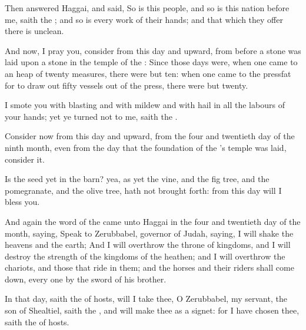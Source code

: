 \verse Then answered Haggai, and said, So is this people, and so is this nation before me, saith the \LORD; and so is every work of their hands; and that which they offer there is unclean.

\verse And now, I pray you, consider from this day and upward, from before a stone was laid upon a stone in the temple of the \LORD: \verse Since those days were, when one came to an heap of twenty measures, there were but ten: when one came to the pressfat for to draw out fifty vessels out of the press, there were but twenty.

\verse I smote you with blasting and with mildew and with hail in all the labours of your hands; yet ye turned not to me, saith the \LORD.

\verse Consider now from this day and upward, from the four and twentieth day of the ninth month, even from the day that the foundation of the \LORD's temple was laid, consider it.

\verse Is the seed yet in the barn? yea, as yet the vine, and the fig tree, and the pomegranate, and the olive tree, hath not brought forth: from this day will I bless you.

\verse And again the word of the \LORD came unto Haggai in the four and twentieth day of the month, saying, \verse Speak to Zerubbabel, governor of Judah, saying, I will shake the heavens and the earth; \verse And I will overthrow the throne of kingdoms, and I will destroy the strength of the kingdoms of the heathen; and I will overthrow the chariots, and those that ride in them; and the horses and their riders shall come down, every one by the sword of his brother.

\verse In that day, saith the \LORD of hosts, will I take thee, O Zerubbabel, my servant, the son of Shealtiel, saith the \LORD, and will make thee as a signet: for I have chosen thee, saith the \LORD of hosts.

